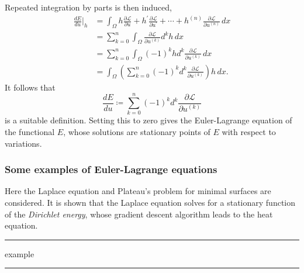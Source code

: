 \documentclass[11pt,a4paper]{memoir}
\newcommand{\fancyL}{\mathcal{L}}
\newcommand{\om}{\Omega}
\newcommand{\pom}{{\partial\Omega}}
\newcommand{\diver}{\text{div}}
\newcommand{\todo}[1]{\vskip 0.1in \hrule \vskip 0.03in {#1} \vskip 0.03in \hrule \vskip 0.1in}
\begin{document}
Repeated integration by parts is then induced,
\begin{align*}
    \frac{dE}{du}\Big|_h &=
        \int_\Omega h\frac{\partial\mathcal{L}}{\partial u}
            + h^\prime\frac{\partial\fancyL}{\partial u^\prime}
            + \cdots
            + h^{(n)}\frac{\partial\fancyL}{\partial u^{(n)}}\,dx \\
    &= \sum_{k=0}^n \int_\om \frac{\partial\mathcal L}{\partial u^{(k)}} d^k h \,dx \\
    &= \sum_{k=0}^n \int_\om (-1)^k h d^k \frac{\partial\mathcal L}{\partial u^{(k)}}\,dx \\
    &= \int_\om \left(\sum_{k=0}^n (-1)^k d^k \frac{\partial\mathcal L}{\partial u^{(k)}}\right)h\,dx.
\end{align*}
It follows that
\begin{equation}\label{functional_gradient_zero_boundary}
    \frac{dE}{du} \coloneqq \sum_{k=0}^n (-1)^k d^k \frac{\partial\mathcal L}{\partial u^{(k)}}
\end{equation}
is a suitable definition. Setting this to zero gives the Euler-Lagrange equation of the functional $E$,
whose solutions are stationary points of $E$ with respect to variations.




\subsubsection{Some examples of Euler-Lagrange equations}
Here the Laplace equation and Plateau's problem for minimal surfaces are considered.
It is shown that the Laplace equation solves for a stationary function of the \textit{Dirichlet energy},
whose gradient descent algorithm leads to the heat equation.
\todo{example}
\end{document}
